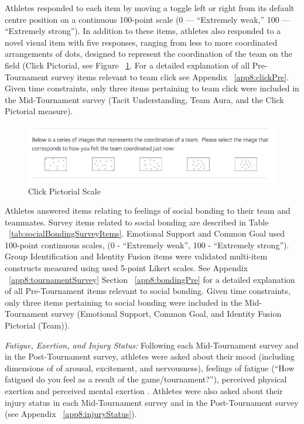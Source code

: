 \begin{CJK}{UTF8}{gbsn}
Athletes responded to each item by moving a toggle left or right from its default centre position on a continuous 100-point scale (0 --- ``Extremely weak,'' 100 --- ``Extremely strong''). In addition to these items, athletes also responded to a novel visual item with five responses, ranging from less to more coordinated arrangements of dots, designed to represent the coordination of the team on the field (Click Pictorial, see Figure ~\ref{fig:clickPictorial}.  For a detailed explanation of all Pre-Tournament survey items relevant to team click see Appendix ~\ref{app8:clickPre}.  Given time constraints, only three items pertaining to team click were included in the Mid-Tournament survey (Tacit Understanding, Team Aura, and the Click Pictorial measure).

  \begin{figure}[htbp]
    \includegraphics[width = \linewidth]{images/teamClickPictorial.png}
    \caption{Click Pictorial Scale}
    \label{fig:clickPictorial}
  \end{figure}

Athletes answered items relating to feelings of social bonding to their team and teammates.  Survey items related to social bonding are described in Table ~\ref{tab:socialBondingSurveyItems}.  Emotional Support and Common Goal used 100-point continuous scales, (0 - ``Extremely weak'', 100 - ``Extremely strong'').  Group Identification and Identity Fusion items were validated multi-item constructs measured using used 5-point Likert scales.  See Appendix ~\ref{app8:tournamentSurvey} Section ~\ref{app8:bondingPre} for a detailed explanation of all Pre-Tournament items relevant to social bonding.  Given time constraints, only three items pertaining to social bonding were included in the Mid-Tournament survey (Emotional Support, Common Goal, and Identity Fusion Pictorial (Team)).




\textit{Fatigue, Exertion, and Injury Status:} Following each Mid-Tournament survey and in the Post-Tournament survey, athletes were asked about their mood (including dimensions of  of arousal, excitement, and nervousness), feelings of fatigue (``How fatigued do you feel as a result of the game/tournament?''), perceived physical exertion \citep[Borg RPE scale;][]{Borg1990} and perceived mental exertion \citep[see][]{Noakes2012a}. Athletes were also asked about their injury status in each Mid-Tournament survey and in the Post-Tournament survey (see Appendix ~\ref{app8:injuryStatus}).


\end{CJK}
